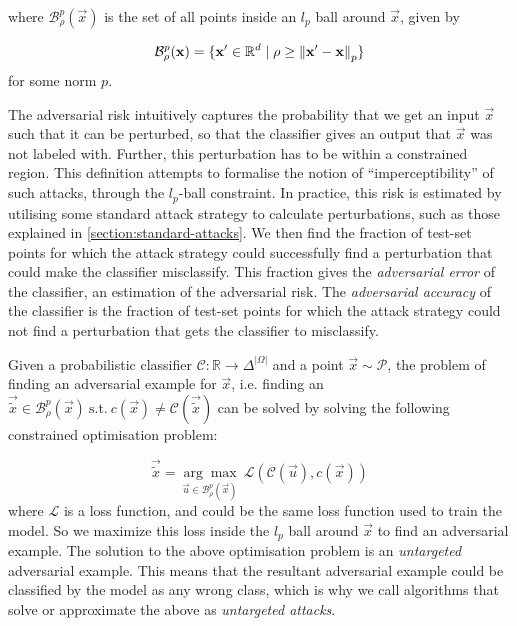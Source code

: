 \documentclass{ociamthesis}
\begin{document}
where $\mathcal{B}_\rho^p(\vec{x})$ is the set of all points inside an $l_p$
ball around $\vec{x}$, given by 

\begin{equation*}
    \mathcal{B}_\rho^p({\mathbf{x}}) = \{{\mathbf{x'}} \in
    \mathbb{R}^d \mid \rho \geq \mathrm{\left\lVert{\mathbf{x'}} - {\mathbf{x}}\right\rVert}_p\}
\end{equation*}
for some norm $p$.

The adversarial risk intuitively captures the probability that we get an input
$\vec{x}$ such that it can be perturbed, so that the classifier gives an output
that $\vec{x}$ was not labeled with. Further, this perturbation has to be within
a constrained region. This definition attempts to formalise the notion of
``imperceptibility'' of such attacks, through the $l_p$-ball constraint. In
practice, this risk is estimated by utilising some standard attack strategy to
calculate perturbations, such as those explained in
\cref{section:standard-attacks}. We then find the fraction of test-set points
for which the attack strategy could successfully find a perturbation that could
make the classifier misclassify. This fraction gives the \emph{adversarial
error} of the classifier, an estimation of the adversarial risk. The
\emph{adversarial accuracy} of the classifier is the fraction of test-set points
for which the attack strategy could not find a perturbation that gets the
classifier to misclassify.


Given a probabilistic classifier $\mathcal{C}: \mathbb{R}\to\Delta^{|\Omega|}$
and a point $\vec{x} \sim \mathcal{P}$, the problem of finding an adversarial
example for $\vec{x}$, i.e. finding an $\vec{\tilde{x}} \in
\mathcal{B}_\rho^p(\vec{x})~\text{s.t.}~c(\vec{x}) \neq
\mathcal{C}(\vec{\tilde{x}})$ can be solved by solving the following constrained
optimisation problem:

\begin{equation*}
    \vec{\tilde{x}} = \underset{\vec{u} \in \mathcal{B}_\rho^p(\vec{x})}
    {\arg\max}~\mathcal{L}(\mathcal{C}(\vec{u}), c(\vec{x}))
\end{equation*}
where $\mathcal{L}$ is a loss function, and could be the same loss function used
to train the model. So we maximize this loss inside the $l_p$ ball around
$\vec{x}$ to find an adversarial example. The solution to the above optimisation
problem is an \emph{untargeted} adversarial example. This means that the
resultant adversarial example could be classified by the model as any wrong
class, which is why we call algorithms that solve or approximate the above as
\emph{untargeted attacks}.
\end{document}
